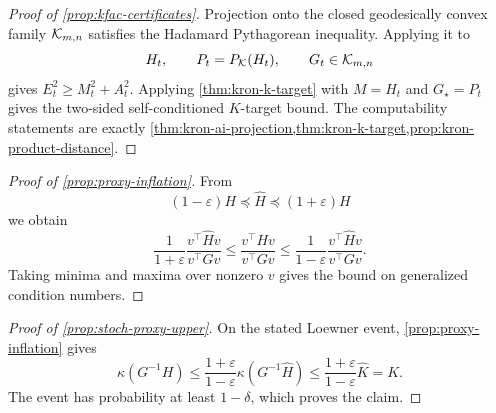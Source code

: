 \begin{proof}[Proof of \cref{prop:kfac-certificates}]
Projection onto the closed geodesically convex family \(\mathcal K_{m,n}\) satisfies
the Hadamard Pythagorean inequality. Applying it to
\[
  H_t,\qquad P_t=P_{\mathcal K}(H_t),\qquad G_t\in\mathcal K_{m,n}
\]
gives \(E_t^2\ge M_t^2+A_t^2\). Applying
\cref{thm:kron-k-target} with \(M=H_t\) and \(G_\star=P_t\) gives the two-sided
self-conditioned \(K\)-target bound. The computability statements are exactly
\cref{thm:kron-ai-projection,thm:kron-k-target,prop:kron-product-distance}.
\end{proof}

\begin{proof}[Proof of \cref{prop:proxy-inflation}]
From
\[
  (1-\varepsilon)H\preceq \widehat H\preceq (1+\varepsilon)H
\]
we obtain
\[
  \frac{1}{1+\varepsilon}
  \frac{v^\top\widehat H v}{v^\top Gv}
  \le
  \frac{v^\top H v}{v^\top Gv}
  \le
  \frac{1}{1-\varepsilon}
  \frac{v^\top\widehat H v}{v^\top Gv}.
\]
Taking minima and maxima over nonzero \(v\) gives the bound on generalized
condition numbers.
\end{proof}

\begin{proof}[Proof of \cref{prop:stoch-proxy-upper}]
On the stated Loewner event, \cref{prop:proxy-inflation} gives
\[
  \kappa(G^{-1}H)
  \le
  \frac{1+\varepsilon}{1-\varepsilon}
  \kappa(G^{-1}\widehat H)
  \le
  \frac{1+\varepsilon}{1-\varepsilon}\widehat K
  =K.
\]
The event has probability at least \(1-\delta\), which proves the claim.
\end{proof}
